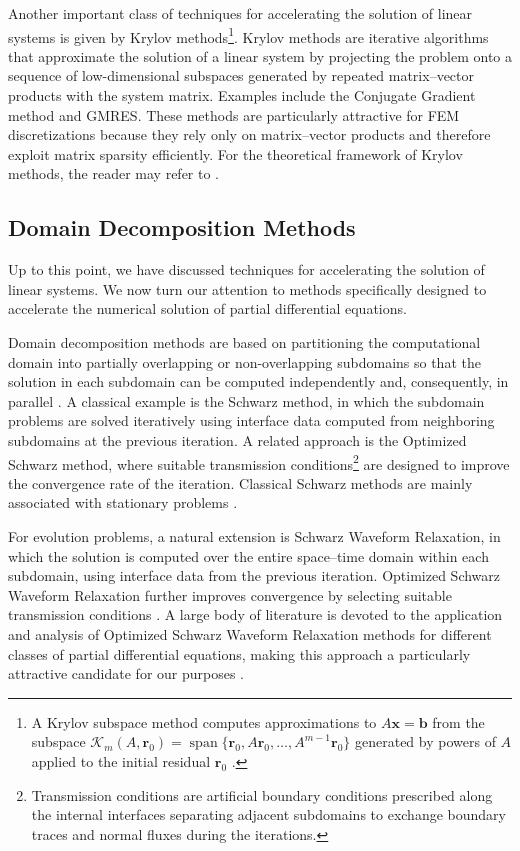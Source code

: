 \documentclass{Configuration_Files/PoliMi3i_thesis}
\newif\ifshowthesischanges
\DeclareRobustCommand{\thesischange}[2]{%
    \ifshowthesischanges
        \textcolor{#1}{#2}%
    \else
        #2%
    \fi
}
\def\thesischange#1#2{#2}%
\begin{document}
Another important class of techniques for accelerating the solution of linear systems is given by Krylov methods\footnote{\thesischange{red}{A Krylov subspace method computes approximations to $A\mathbf{x}=\mathbf{b}$ from the subspace $\mathcal{K}_m(A, \mathbf{r}_0) = \operatorname{span}\{\mathbf{r}_0, A\mathbf{r}_0, \dots, A^{m-1}\mathbf{r}_0\}$ generated by powers of $A$ applied to the initial residual $\mathbf{r}_0$ \citep{liesen_krylov_2012}.}}. Krylov methods are iterative algorithms that approximate the solution of a linear system by projecting the problem onto a sequence of low-dimensional subspaces generated by repeated matrix--vector products with the system matrix. Examples include the Conjugate Gradient method and GMRES. These methods are particularly attractive for FEM discretizations because they rely only on matrix--vector products and therefore exploit matrix sparsity efficiently. For the theoretical framework of Krylov methods, the reader may refer to \cite{liesen_krylov_2012}.

\subsection{Domain Decomposition Methods}
Up to this point, we have discussed techniques for accelerating the solution of linear systems. We now turn our attention to methods specifically designed to accelerate the numerical solution of partial differential equations.

Domain decomposition methods are based on partitioning the computational domain into partially overlapping or non-overlapping subdomains so that the solution in each subdomain can be computed independently and, consequently, in parallel \citep{quarteroni_domain_1999}. A classical example is the Schwarz method, in which the subdomain problems are solved iteratively using interface data computed from neighboring subdomains at the previous iteration. A related approach is the Optimized Schwarz method, where suitable transmission conditions\footnote{\thesischange{red}{Transmission conditions are artificial boundary conditions prescribed along the internal interfaces separating adjacent subdomains to exchange boundary traces and normal fluxes during the iterations.}} are designed to improve the convergence rate of the iteration. Classical Schwarz methods are mainly associated with stationary problems \citep{dolean_introduction_2015}.

For evolution problems, a natural extension is Schwarz Waveform Relaxation, in which the solution is computed over the entire space--time domain within each subdomain, using interface data from the previous iteration. Optimized Schwarz Waveform Relaxation further improves convergence by selecting suitable transmission conditions \citep{barth_schwarz_2008}. A large body of literature is devoted to the application and analysis of Optimized Schwarz Waveform Relaxation methods for different classes of partial differential equations, making this approach a particularly attractive candidate for our purposes \citep{gander_optimal_1999,martin_optimized_2005,gander_optimized_2007,al-khaleel_optimized_2024,ciaramella_convergence_2024}.
\end{document}
